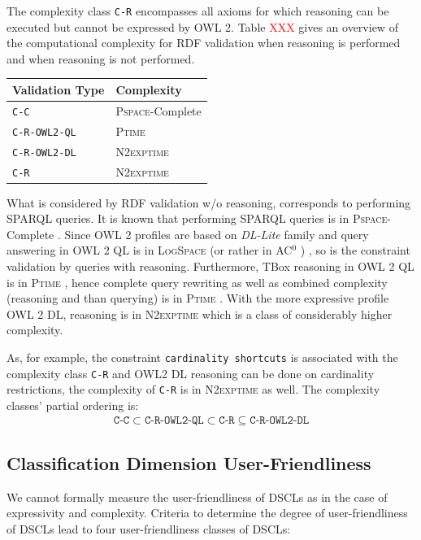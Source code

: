 \documentclass{llncs}
\newcommand{\ms}[1]{\texttt{#1}}
\newenvironment{complexity}{
  \scriptsize
  \sffamily
  \vspace{0.3cm}
  \begin{tabular}{l|l}
  \hline
  \textbf{Validation Type} & \textbf{Complexity} \\
  \hline

}{
  \hline
  \end{tabular}
  \linebreak
}
\begin{document}
The complexity class \ms{C-R} encompasses all axioms for which reasoning can be executed but cannot be expressed by OWL 2.  
Table \textcolor{red}{XXX} gives an overview of the computational complexity for RDF validation when reasoning is performed and when reasoning is not performed. 
\begin{center}
\begin{complexity}
\ms{C-C} & \textsc{Pspace}-Complete \\
\ms{C-R-OWL2-QL} & \textsc{Ptime} \\
\ms{C-R-OWL2-DL} & \textsc{N2exptime} \\
\ms{C-R} & \textsc{N2exptime} \\
\end{complexity}
\end{center}
What is considered by RDF validation w/o reasoning, corresponds to performing SPARQL queries.  It is known that performing SPARQL queries is in \textsc{Pspace}-Complete \cite{Perez2009}. Since OWL 2 profiles are based on \textit{DL-Lite} family and query answering in OWL 2 QL is in \textsc{LogSpace} (or rather in AC$^0$ ) \cite{Calvanese2007}, so is the constraint validation by queries with  reasoning. Furthermore, TBox reasoning in OWL 2 QL is in \textsc{Ptime} \cite{Calvanese2007}, hence complete query rewriting as well as combined complexity (reasoning and than querying) is in \textsc{Ptime} \cite{Artale2009,Calvanese2007}.  With the more expressive profile OWL 2 DL, reasoning is in \textsc{N2exptime} \cite{owl2profiles2008} which is a class of considerably higher complexity.

As, for example, the constraint \ms{cardinality shortcuts} is associated with the complexity class \ms{C-R} and OWL2 DL reasoning can be done on cardinality restrictions,
the complexity of \ms{C-R} is in \textsc{N2exptime} as well. 
The complexity classes' partial ordering is:
\begin{eqnarray*}
\ms{C-C} \subset \ms{C-R-OWL2-QL} \subset \ms{C-R} \subseteq \ms{C-R-OWL2-DL}
\end{eqnarray*}

\subsection{Classification Dimension User-Friendliness}

We cannot formally measure the user-friendliness of DSCLs as in the case of expressivity and complexity. 
Criteria to determine the degree of user-friendliness of DSCLs lead to four user-friendliness classes of DSCLs:
\end{document}
